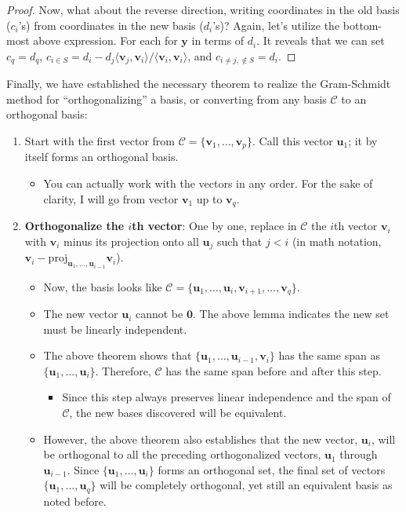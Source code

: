 \documentclass[draft,12pt]{report}
\renewcommand{\vec}[1]{\mathbf{#1}}
\begin{document}
\begin{proof}
    Now, what about the reverse direction, writing coordinates in the old basis ($c_i$'s) from coordinates in the new basis ($d_i$'s)? Again, let's utilize the bottom-most above expression. For each  for $\vec{y}$ in terms of $d_i$. It reveals that we can set $c_q = d_q$, $c_{i \in S} = d_i - d_j \langle \vec{v}_j, \vec{v}_i \rangle / \langle \vec{v}_i, \vec{v}_i \rangle$, and $c_{i \neq j, \notin S} = d_i$.
\end{proof}

Finally, we have established the necessary theorem to realize the Gram-Schmidt method for ``orthogonalizing'' a basis, or converting from any basis $\mathcal{C}$ to an orthogonal basis:
\begin{enumerate}
    \item Start with the first vector from $\mathcal{C} = \{ \vec{v}_1, \ldots, \vec{v}_p \}$. Call this vector $\vec{u}_1$; it by itself forms an orthogonal basis.
    \begin{itemize}
        \item You can actually work with the vectors in any order. For the sake of clarity, I will go from vector $\vec{v}_1$ up to $\vec{v}_q$.
    \end{itemize}
    \item \textbf{Orthogonalize the $i$th vector}: One by one, replace in $\mathcal{C}$ the $i$th vector $\vec{v}_i$ with $\vec{v}_i$ minus its projection onto all $\vec{u}_j$ such that $j < i$ (in math notation, $\vec{v}_i - \mathrm{proj}_{\vec{u}_1, \ldots, \vec{u}_{i - 1}} \vec{v}_i$).
    \begin{itemize}
        \item Now, the basis looks like $\mathcal{C} = \{ \vec{u}_1, \ldots, \vec{u}_i, \vec{v}_{i + 1}, \ldots, \vec{v}_q \}$.
        \item The new vector $\vec{u}_i$ cannot be $\vec{0}$. The above lemma indicates the new set must be linearly independent.
        \item The above theorem shows that $\{ \vec{u}_1, \ldots, \vec{u}_{i - 1}, \vec{v}_i \}$ has the same span as $\{ \vec{u}_1, \ldots, \vec{u}_i \}$. Therefore, $\mathcal{C}$ has the same span before and after this step.
        \begin{itemize}
            \item Since this step always preserves linear independence and the span of $\mathcal{C}$, the new bases discovered will be equivalent.
        \end{itemize}
        \item However, the above theorem also establishes that the new vector, $\vec{u}_i$, will be orthogonal to all the preceding orthogonalized vectors, $\vec{u}_1$ through $\vec{u}_{i - 1}$. Since $\{ \vec{u}_1, \ldots, \vec{u}_i \}$ forms an orthogonal set, the final set of vectors $\{ \vec{u}_1, \ldots, \vec{u}_q \}$ will be completely orthogonal, yet still an equivalent basis as noted before.

\end{itemize}
\end{enumerate}
\end{document}
